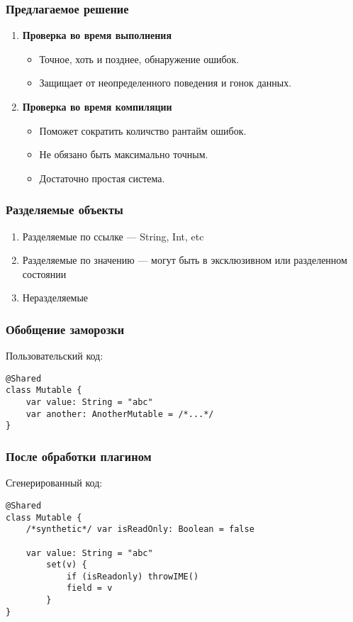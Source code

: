 \documentclass[14pt,xcolor={dvipsnames}]{beamer}
\begin{document}
\begin{frame}
\frametitle{Предлагаемое решение}
\begin{enumerate}
  \item \textbf{Проверка во время выполнения}
  \begin{itemize}
    \item Точное, хоть и позднее, обнаружение ошибок.
    \item Защищает от неопределенного поведения и гонок данных.
  \end{itemize}
  \item \textbf{Проверка во время компиляции}
  \begin{itemize}
    \item Поможет сократить количство рантайм ошибок.
    \item Не обязано быть максимально точным.
    \item Достаточно простая система.
  \end{itemize}
\end{enumerate}
\end{frame}

\begin{frame}
\frametitle{Разделяемые объекты}
\begin{enumerate}
	\item Разделяемые по ссылке --- String, Int, etc
	\item Разделяемые по значению --- могут быть в эксклюзивном или разделенном состоянии
	\item Неразделяемые
\end{enumerate}
\end{frame}

\begin{frame}[fragile]
\frametitle{Обобщение заморозки}
Пользовательский код:
\vspace{20pt}
\begin{lstlisting}[basicstyle=\small\ttfamily]
@Shared
class Mutable {
	var value: String = "abc"
	var another: AnotherMutable = /*...*/
}
\end{lstlisting}
\end{frame}

\begin{frame}[fragile]
\frametitle{После обработки плагином}
Сгенерированный код:
\begin{lstlisting}[basicstyle=\fontsize{10}{1}\selectfont\ttfamily]
@Shared
class Mutable {
	/*synthetic*/ var isReadOnly: Boolean = false
	
	var value: String = "abc"
		set(v) {
			if (isReadonly) throwIME() 
			field = v
		}
}
\end{lstlisting}
\end{frame}
\end{document}
